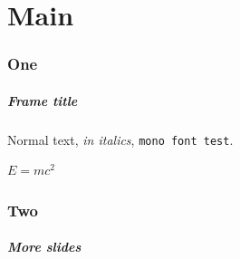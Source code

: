 \documentclass[topmenu]{taltechslides}
\begin{document}
\maketitle

\part{Main}

\section{One}

\begin{frame}[fragile]
    \frametitle{Frame title}

    Normal text, \textit{in italics}, \texttt{mono font test}.

    \(E=mc^2\)

\end{frame}


{%
    \beamertemplatenavigationsymbolsempty
    \begin{frame}[plain]\end{frame}
}

\section{Two}

\begin{frame}[fragile]
    \frametitle{More slides}

    

\end{frame}
\end{document}
